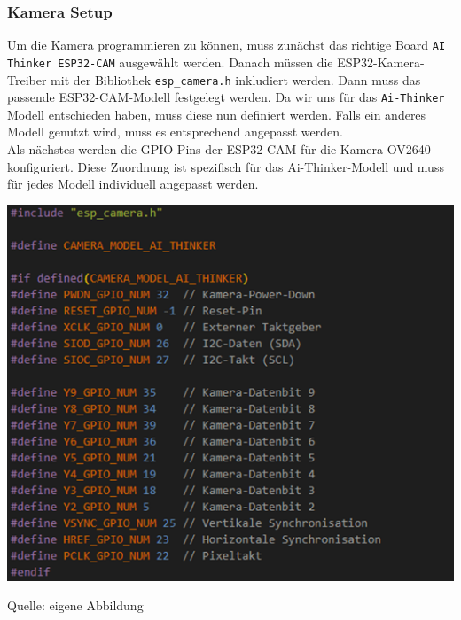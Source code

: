 \documentclass[ngerman,12pt,a4paper]{article}
\begin{document}
			\subsubsection{Kamera Setup}
			Um die Kamera programmieren zu können, muss zunächst das richtige Board \texttt{AI Thinker ESP32-CAM} ausgewählt werden. Danach müssen die ESP32-Kamera-Treiber mit der Bibliothek \texttt{esp\_camera.h} inkludiert werden. Dann muss das passende ESP32-CAM-Modell festgelegt werden. Da wir uns für das \texttt{Ai-Thinker} Modell entschieden haben, muss diese nun definiert werden. Falls ein anderes Modell genutzt wird, muss es entsprechend angepasst werden. \\[0.2cm]
			Als nächstes werden die GPIO-Pins der ESP32-CAM für die Kamera OV2640 konfiguriert. Diese Zuordnung ist spezifisch für das Ai-Thinker-Modell und muss für jedes Modell individuell angepasst werden. \\
			\begin{center}
				\begin{minipage}[t]{0.90\textwidth}
					\includegraphics{Pictures/kamera-setup1}
					\label{fig:Kamera-GPIO Konfiguration}
					\vspace{-10pt}
					\begin{center}
						\par\small Quelle: eigene Abbildung 
					\end{center}
				\end{minipage} \\[0.70cm]
			\end{center}
\end{document}
